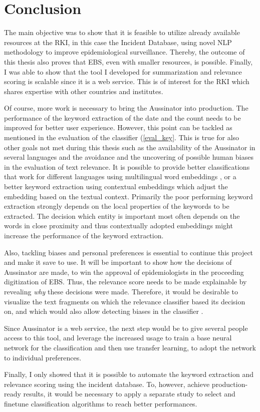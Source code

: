 \chapter{Conclusion}
  The main objective was to show that it is feasible to utilize already available resources at the RKI, in this case the Incident Database, using novel NLP methodology to improve epidemiological surveillance.
  Thereby, the outcome of this thesis also proves that EBS, even with smaller resources, is possible.
  Finally, I was able to show that the tool I developed for summarization and relevance scoring is scalable since it is a web service. This is of interest for the RKI which shares expertise with other countries and institutes.

  Of course, more work is necessary to bring the Aussinator into production.
  The performance of the keyword extraction of the date and the count needs to be improved for better user experience.
  However, this point can be tackled as mentioned in the evaluation of the classifier (\ref{eval_key}.
  This is true for also other goals not met during this thesis such as the availability of the Aussinator in several languages and the avoidance and the uncovering of possible human biases in the evaluation of text relevance.
  It is possible to provide better classifications that work for different languages using multilingual word embeddings \citep{Chen2018}, or a better keyword extraction using contextual embeddings \citep{Devlin2018, Peters2018} which adjust the embedding based on the textual context.
  Primarily the poor performing keyword extraction strongly depends on the local properties of the keywords to be extracted. The decision which entity is important most often depends on the words in close proximity and thus contextually adopted embeddings might increase the performance of the keyword extraction.

  Also, tackling biases and personal preferences is essential to continue this project and make it save to use.
  It will be important to show how the decisions of Aussinator are made, to win the approval of epidemiologists in the proceeding digitization of EBS.
  Thus, the relevance score needs to be made explainable by revealing \emph{why} these decisions were made.
  Therefore, it would be desirable to visualize the text fragments on which the relevance classifier based its decision on, and which would also allow detecting biases in the classifier \citep{Arras2017}.

  Since Aussinator is a web service, the next step would be to give several people access to this tool, and leverage the increased usage to train a base neural network for the classification and then use transfer learning, to adopt the network to individual preferences.

  Finally, I only showed that it is possible to automate the keyword extraction and relevance scoring using the incident database.
  To, however, achieve production-ready results, it would be necessary to apply a separate study to select and finetune classification algorithms to reach better performances.
